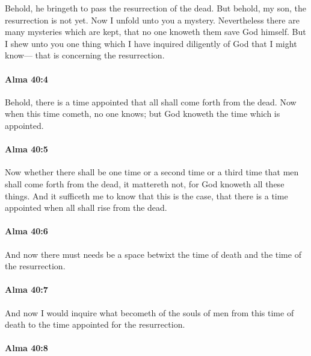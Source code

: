 			Behold, he bringeth to pass the resurrection of the dead.
			But behold, my son, the resurrection is not yet.
			Now I unfold unto you a mystery.
			Nevertheless there are many mysteries which are kept,
			that no one knoweth them save God himself.
			But I shew unto you one thing
			which I have inquired diligently of God that I might know---
			that is concerning the resurrection.

		\paragraph{Alma 40:4} %
			\label{ALMA-40-4}

			Behold, there is a time appointed that all shall come forth from the dead.
			Now when this time cometh, no one knows;
			but God knoweth the time which is appointed.

		\paragraph{Alma 40:5} %
			\label{ALMA-40-5}

			Now whether there shall be one time or a second time or a third time
			that men shall come forth from the dead,
			it mattereth not,
			for God knoweth all these things.
			And it sufficeth me to know that this is the case,
			that there is a time appointed when all shall rise from the dead.

		\paragraph{Alma 40:6} %
			\label{ALMA-40-6}

			And now there must needs be a space
			betwixt the time of death and the time of the resurrection.

		\paragraph{Alma 40:7} %
			\label{ALMA-40-7}

			And now I would inquire what becometh of the souls of men
			from this time of death to the time appointed for the resurrection.

		\paragraph{Alma 40:8} %
			\label{ALMA-40-8}

